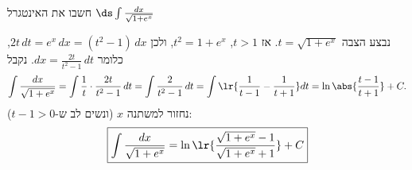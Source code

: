 חשבו את האינטגרל
$\ds \int \frac{dx}{\sqrt{1+e^{x}}}$
\begin{solbox}
\unverified
נבצע הצבה
$t=\sqrt{1+e^x}$.
אז
$t>1$,
$t^2=1+e^x$,
ולכן
$2t\,dt=e^x\,dx=(t^2-1)\,dx$,
כלומר
$dx=\frac{2t}{t^2-1}\,dt$.
נקבל
\begin{align*}
\int\frac{dx}{\sqrt{1+e^x}}
=\int\frac{1}{t}\cdot\frac{2t}{t^2-1}\,dt
=\int\frac{2}{t^2-1}\,dt
=\int\lr{\frac{1}{t-1}-\frac{1}{t+1}}dt
=\ln\abs{\frac{t-1}{t+1}}+C.
\end{align*}
נחזור למשתנה
$x$
(ונשים לב ש-$t-1>0$):
\begin{align*}
\boxed{\int\frac{dx}{\sqrt{1+e^x}}=\ln\lr{\frac{\sqrt{1+e^x}-1}{\sqrt{1+e^x}+1}}+C}
\end{align*}
\end{solbox}
